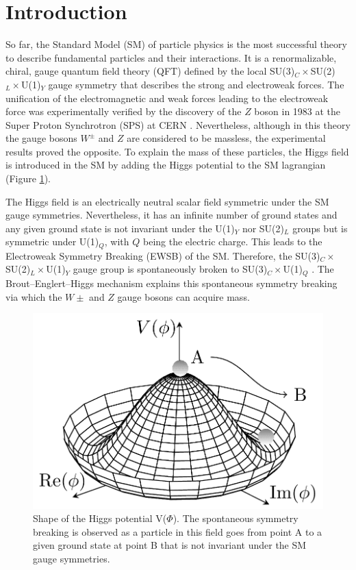 \section{Introduction} \label{intro}

So far, the Standard Model (SM) of particle physics is the most successful theory to describe fundamental particles and their interactions. It is a renormalizable, chiral, gauge quantum field theory (QFT) defined by the local SU(3)$_C \times$SU(2)$_L\times$U(1)$_Y$ gauge symmetry that describes the strong and electroweak forces.  The unification of the electromagnetic and weak forces leading to the electroweak force was experimentally verified by the discovery of the $Z$ boson in 1983 at the Super Proton Synchrotron (SPS) at CERN \cite{Zboson}. Nevertheless, although in this theory the gauge bosons $W^\pm$ and $Z$ are considered to be massless, the experimental results proved the opposite. To explain the mass of these particles, the Higgs field is introduced in the SM by adding the Higgs potential to the SM lagrangian (Figure \ref{fig: Higgs portential}).

The Higgs field is an electrically neutral scalar field symmetric under the SM gauge symmetries. Nevertheless, it has an infinite number of ground states and any given ground state is not invariant under the U(1)$_Y$ nor SU(2)$_L$ groups but is symmetric under U(1)$_Q$, with $Q$ being the electric charge. This leads to the Electroweak Symmetry Breaking (EWSB) of the SM. Therefore, the SU(3)$_C \times$SU(2)$_L\times$U(1)$_Y$ gauge group is spontaneously broken to SU(3)$_C \times$U(1)$_Q$ \cite{EWSB}. The Brout–Englert–Higgs mechanism explains this spontaneous symmetry breaking via which the $W\pm$ and $Z$ gauge bosons can acquire mass. \cite{Higgs64}

\begin{figure}[hbt]
    \centering
    \includegraphics[width=0.4\linewidth]{Images/1.Intro/higgs-potential.png}
    \caption{Shape of the Higgs potential V($\Phi$). The spontaneous symmetry breaking is observed as a particle in this field goes from point A to a given ground state at point B that is not invariant under the SM gauge symmetries. \cite{HiggsPotdrawing}}
    \label{fig: Higgs portential}
\end{figure}

